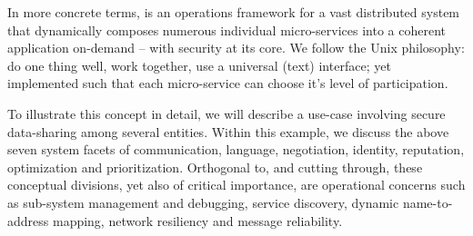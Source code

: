 In more concrete terms, \projectName is an operations framework for a vast distributed system that dynamically composes numerous individual micro-services into a coherent application on-demand -- with security at its core.
We follow the Unix philosophy: do one thing well, work together, use a universal (text) interface; yet implemented such that each micro-service can choose it's level of participation.

To illustrate this concept in detail, we will describe a use-case involving secure data-sharing among several entities.
Within this example, we discuss the above seven system facets of communication, language, negotiation, identity, reputation, optimization and prioritization.
Orthogonal to, and cutting through, these conceptual divisions, yet also of critical importance, are operational concerns such as sub-system management and debugging, service discovery, dynamic name-to-address mapping, network resiliency and message reliability.
